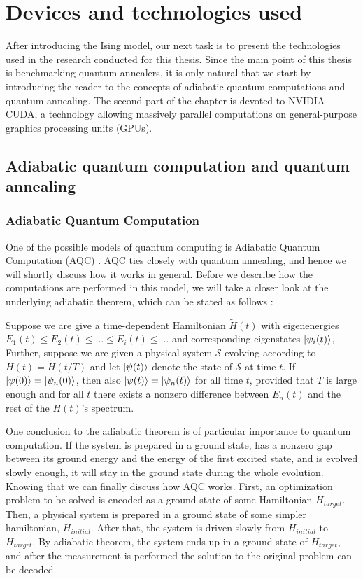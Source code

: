 \chapter{Devices and technologies used}
\label{chapter:near-term}

After introducing the Ising model, our next task is to present the technologies used in the
research conducted for this thesis. Since the main point of this thesis is benchmarking quantum
annealers, it is only natural that we start by introducing the reader to the concepts of adiabatic
quantum computations and quantum annealing. The second part of the chapter is devoted to NVIDIA
CUDA, a technology allowing massively parallel computations on general-purpose graphics processing
units (GPUs).


\section{Adiabatic quantum computation and quantum annealing}

\subsection{Adiabatic Quantum Computation}
One of the possible models of quantum computing is Adiabatic Quantum Computation (AQC)
\cite{farhi}. AQC ties closely with quantum annealing, and hence we will shortly discuss how it
works in general. Before we describe how the computations are performed in this model, we will take
a closer look at the underlying adiabatic theorem, which can be stated as follows \cite{farhi,
born}:

\begin{theorem}
Suppose we are give a time-dependent Hamiltonian $\tilde{H}(t)$ with eigenenergies $E_1(t) \le E_2(t) \le
 \ldots \le E_i(t) \le \ldots$ and corresponding eigenstates $\ket{\psi_i(t)}$, Further, suppose we
 are given a physical system $\mathcal{S}$ evolving according to $H(t) = \tilde{H}(t/T)$ and let
 $\ket{\psi(t)}$ denote the state of $\mathcal{S}$ at time $t$. If $\ket{\psi(0)} =
 \ket{\psi_n(0)}$, then also $\ket{\psi(t)} = \ket{\psi_n(t)}$ for all time $t$, provided that $T$ is large
 enough and for all $t$ there
 exists a nonzero difference between $E_n(t)$ and the rest of the $H(t)$'s spectrum.
\end{theorem}

One conclusion to the adiabatic theorem is of particular importance to quantum computation. If the
system is prepared in a ground state, has a nonzero gap between its ground energy and the energy of
the first excited state, and is evolved slowly enough, it will stay in the ground state during the
whole evolution. Knowing that we can finally discuss how AQC works. First, an optimization problem
to be solved is encoded as a ground state of some Hamiltonian $H_{target}$. Then, a physical system
is prepared in a ground state of some simpler hamiltonian, $H_{initial}$. After that, the system is
driven slowly from $H_{initial}$ to $H_{target}$. By adiabatic theorem, the system ends up in a
ground state of $H_{target}$, and after the measurement is performed the solution to the original
problem can be decoded.

